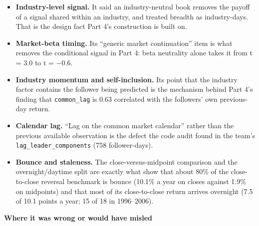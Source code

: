 \begin{itemize}
\tightlist
\item
  \textbf{Industry-level signal.} It said an industry-neutral book removes the payoff of a
  signal shared within an industry, and treated breadth as industry-days. That is the
  design fact Part 4's construction is built on.
\item
  \textbf{Market-beta timing.} Its ``generic market continuation'' item is what removes the
  conditional signal in Part 4: beta neutrality alone takes it from t = 3.0 to t = −0.6.
\item
  \textbf{Industry momentum and self-inclusion.} Its point that the industry factor contains
  the follower being predicted is the mechanism behind Part 4's finding that
  \texttt{common\_lag} is 0.63 correlated with the followers' own previous-day return.
\item
  \textbf{Calendar lag.} ``Lag on the common market calendar'' rather than the previous
  available observation is the defect the code audit found in the team's
  \texttt{lag\_leader\_components} (758 follower-days).
\item
  \textbf{Bounce and staleness.} The close-versus-midpoint comparison and the
  overnight/daytime split are exactly what show that about 80\% of the close-to-close
  reversal benchmark is bounce (10.1\% a year on closes against 1.9\% on midpoints) and that
  most of its close-to-close return arrives overnight (7.5 of 10.1 points a year; 15 of 18
  in 1996--2006).
\end{itemize}

\textbf{Where it was wrong or would have misled}

